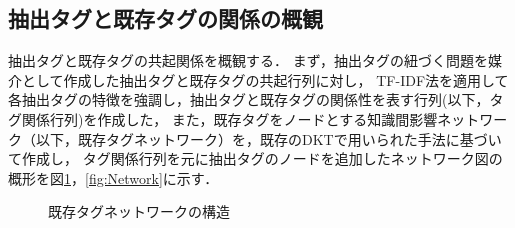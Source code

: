 \subsection{抽出タグと既存タグの関係の概観}
抽出タグと既存タグの共起関係を概観する．
まず，抽出タグの紐づく問題を媒介として作成した抽出タグと既存タグの共起行列に対し，
TF-IDF法を適用して各抽出タグの特徴を強調し，抽出タグと既存タグの関係性を表す行列(以下，タグ関係行列)を作成した，
また，既存タグをノードとする知識間影響ネットワーク（以下，既存タグネットワーク）を，既存のDKTで用いられた手法に基づいて作成し，
タグ関係行列を元に抽出タグのノードを追加したネットワーク図の概形を図\ref{fig:SimpleNetwork}，\ref{fig:Network}に示す．


\begin{figure}[h]
\begin{center}
\end{center}
\caption{既存タグネットワークの構造}
\label{fig:SimpleNetwork}
\end{figure}

